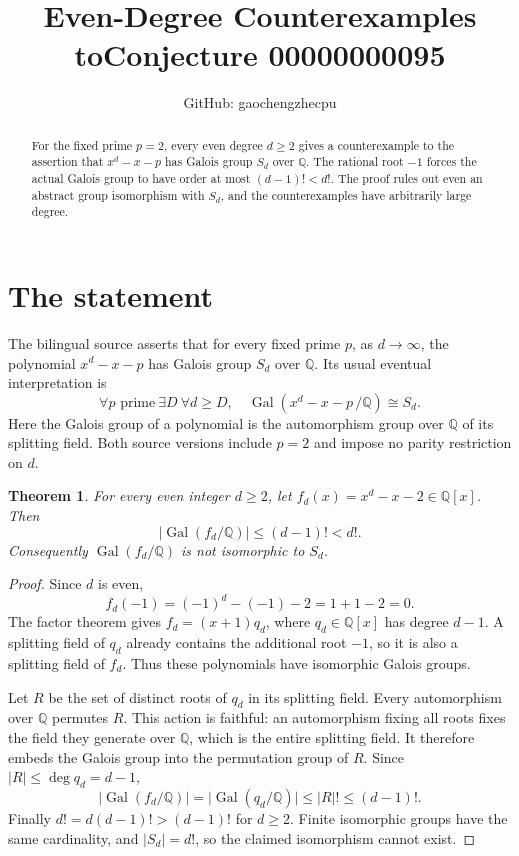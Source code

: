 \documentclass[11pt]{article}
\title{Even-Degree Counterexamples to\newline Conjecture 00000000095}
\author{GitHub: gaochengzhecpu}
\date{}
\newtheorem{theorem}{Theorem}
\newcommand{\Q}{\mathbb Q}
\newcommand{\Gal}{\operatorname{Gal}}
\begin{document}
\maketitle
\begin{abstract}
For the fixed prime $p=2$, every even degree $d\ge2$ gives a counterexample to the assertion that $x^d-x-p$ has Galois group $S_d$ over $\Q$. The rational root $-1$ forces the actual Galois group to have order at most $(d-1)!<d!$. The proof rules out even an abstract group isomorphism with $S_d$, and the counterexamples have arbitrarily large degree.
\end{abstract}

\section*{The statement}
The bilingual source asserts that for every fixed prime $p$, as $d\to\infty$, the polynomial $x^d-x-p$ has Galois group $S_d$ over $\Q$. Its usual eventual interpretation is
\[
 \forall p\text{ prime}\ \exists D\ \forall d\ge D,\quad
 \Gal(x^d-x-p\,/\Q)\cong S_d.
\]
Here the Galois group of a polynomial is the automorphism group over $\Q$ of its splitting field. Both source versions include $p=2$ and impose no parity restriction on $d$.

\begin{theorem}\label{thm:counter}
For every even integer $d\ge2$, let $f_d(x)=x^d-x-2\in\Q[x]$. Then
\[
 \bigl|\Gal(f_d/\Q)\bigr|\le(d-1)!<d!.
\]
Consequently $\Gal(f_d/\Q)$ is not isomorphic to $S_d$.
\end{theorem}
\begin{proof}
Since $d$ is even,
\[
 f_d(-1)=(-1)^d-(-1)-2=1+1-2=0.
\]
The factor theorem gives $f_d=(x+1)q_d$, where $q_d\in\Q[x]$ has degree $d-1$. A splitting field of $q_d$ already contains the additional root $-1$, so it is also a splitting field of $f_d$. Thus these polynomials have isomorphic Galois groups.

Let $R$ be the set of distinct roots of $q_d$ in its splitting field. Every automorphism over $\Q$ permutes $R$. This action is faithful: an automorphism fixing all roots fixes the field they generate over $\Q$, which is the entire splitting field. It therefore embeds the Galois group into the permutation group of $R$. Since $|R|\le\deg q_d=d-1$,
\[
 \bigl|\Gal(f_d/\Q)\bigr|
 =\bigl|\Gal(q_d/\Q)\bigr|
 \le |R|!\le(d-1)!.
\]
Finally $d!=d(d-1)!>(d-1)!$ for $d\ge2$. Finite isomorphic groups have the same cardinality, and $|S_d|=d!$, so the claimed isomorphism cannot exist.
\end{proof}
\end{document}
